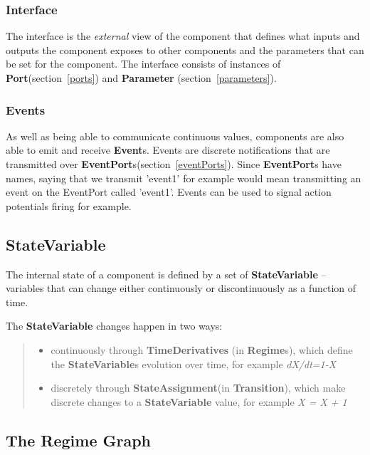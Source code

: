 \documentclass{article}
\newcommand{\StateVariable}{{\bf{StateVariable}}\xspace}
\newcommand{\StateVariables}{{\bf{StateVariable}}s\xspace}
\newcommand{\StateAssignment}{{\bf{StateAssignment}}\xspace}
\newcommand{\EventPorts}{{\bf{EventPort}}s\xspace}
\newcommand{\Port}{{\bf{Port}}\xspace}
\newcommand{\Events}{{\bf{Event}}s\xspace}
\newcommand{\Regimes}{{\bf{Regime}}s\xspace}
\newcommand{\Transition}{{\bf{Transition}}\xspace}
\newcommand{\Parameter}{{\bf{Parameter}}\xspace}
\begin{document}
\subsubsection{Interface}

The interface is the \emph{external} view of the component that defines
what inputs and outputs the component exposes to other components and the
parameters that can be set for the component. The interface consists of
instances of \Port (section~\ref{ports}) and \Parameter
(section~\ref{parameters}).

\subsubsection{Events}
\label{events}

As well as being able to communicate continuous values, components are also
able to emit and receive \Events. Events are discrete notifications
that are transmitted over \EventPorts (section~\ref{eventPorts}). Since
\EventPorts have names, saying that we transmit 'event1' for example
would mean transmitting an event on the EventPort called 'event1'. Events
can be used to signal action potentials firing for example.

\subsection{StateVariable}
\label{state-var}

The internal state of a component is defined by a set of \StateVariable
-- variables that can change either continuously or discontinuously as a
function of time.

The \StateVariable changes happen in two ways:
%
\begin{quote}
\begin{itemize}
\item continuously through \textbf{TimeDerivatives} (in \Regimes),
which define the \StateVariables evolution over time, for example
\textsl{dX/dt=1-X}
\item discretely through \StateAssignment (in \Transition),
which make discrete changes to a \StateVariable value, for example
\textsl{X = X + 1}
\end{itemize}
\end{quote}

\subsection{The Regime Graph}
\label{regime-graph}
\end{document}

